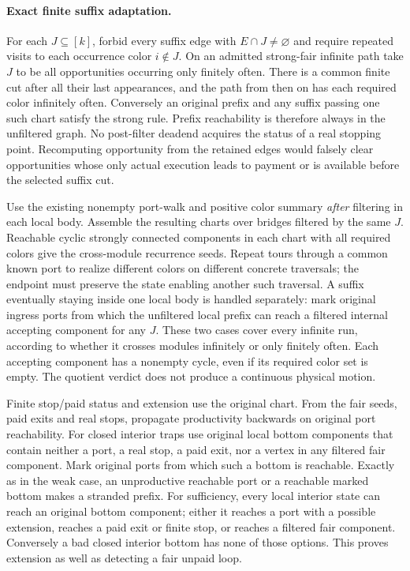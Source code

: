 \documentclass{article}
\begin{document}
\paragraph{Exact finite suffix adaptation.}
For each \(J\subseteq[k]\), forbid every suffix edge with
\(E\cap J\ne\varnothing\) and require repeated visits to each occurrence
color \(i\notin J\). On an admitted strong-fair infinite path take \(J\) to
be all opportunities occurring only finitely often. There is a common
finite cut after all their last appearances, and the path from then on has
each required color infinitely often. Conversely an original prefix and
any suffix passing one such chart satisfy the strong rule. Prefix
reachability is therefore always in the unfiltered graph. No post-filter
deadend acquires the status of a real stopping point. Recomputing
opportunity from the retained edges would falsely clear opportunities
whose only actual execution leads to payment or is available before the
selected suffix cut.

Use the existing nonempty port-walk and positive color summary
\emph{after} filtering in each local body. Assemble the resulting charts
over bridges filtered by the same \(J\). Reachable cyclic strongly
connected components in each chart with all required colors give the
cross-module recurrence seeds. Repeat tours through a common known port
to realize different colors on different concrete traversals; the
endpoint must preserve the state enabling another such traversal.
A suffix eventually staying inside one local body is handled separately:
mark original ingress ports from which the unfiltered local prefix can
reach a filtered internal accepting component for any \(J\).
These two cases cover every infinite run, according to whether it
crosses modules infinitely or only finitely often.
Each accepting component has a nonempty cycle, even if its required
color set is empty. The quotient verdict does not produce a continuous
physical motion.

Finite stop/paid status and extension use the original chart.
From the fair seeds, paid exits and real stops, propagate productivity
backwards on original port reachability. For closed interior traps use
original local bottom components that contain neither a port, a real stop,
a paid exit, nor a vertex in any filtered fair component. Mark original
ports from which such a bottom is reachable. Exactly as in the weak
case, an unproductive reachable port or a reachable marked bottom makes
a stranded prefix. For sufficiency, every local interior state can reach
an original bottom component; either it reaches a port with a possible
extension, reaches a paid exit or finite stop, or reaches a filtered
fair component. Conversely a bad closed interior bottom has none of those
options. This proves extension as well as detecting a fair unpaid loop.
\end{document}
